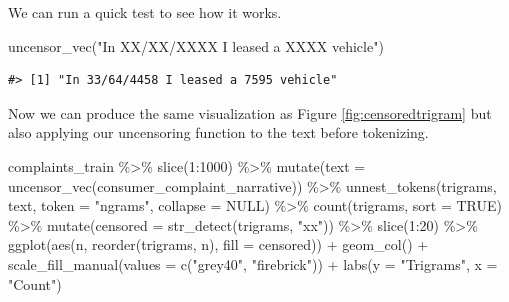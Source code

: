 \documentclass[
]{krantz}
\makeatletter
\newenvironment{Shaded}{\begin{snugshade}}{\end{snugshade}}
\newcommand{\AttributeTok}[1]{\textcolor[rgb]{0.77,0.63,0.00}{#1}}
\newcommand{\ConstantTok}[1]{\textcolor[rgb]{0.00,0.00,0.00}{#1}}
\newcommand{\DecValTok}[1]{\textcolor[rgb]{0.00,0.00,0.81}{#1}}
\newcommand{\FunctionTok}[1]{\textcolor[rgb]{0.00,0.00,0.00}{#1}}
\newcommand{\NormalTok}[1]{#1}
\newcommand{\SpecialCharTok}[1]{\textcolor[rgb]{0.00,0.00,0.00}{#1}}
\newcommand{\StringTok}[1]{\textcolor[rgb]{0.31,0.60,0.02}{#1}}
\newenvironment{kframe}{%
\medskip{}
\setlength{\fboxsep}{.8em}
 \def\at@end@of@kframe{}%
 \ifinner\ifhmode%
  \def\at@end@of@kframe{\end{minipage}}%
  \begin{minipage}{\columnwidth}%
 \fi\fi%
 \def\FrameCommand##1{\hskip\@totalleftmargin \hskip-\fboxsep
 \colorbox{shadecolor}{##1}\hskip-\fboxsep
     \hskip-\linewidth \hskip-\@totalleftmargin \hskip\columnwidth}%
 \MakeFramed {\advance\hsize-\width
   \@totalleftmargin\z@ \linewidth\hsize
   \@setminipage}}%
 {\par\unskip\endMakeFramed%
 \at@end@of@kframe}
\renewenvironment{Shaded}{\begin{kframe}}{\end{kframe}}
\makeatother
\begin{document}
We can run a quick test to see how it works.

\begin{Shaded}
\begin{Highlighting}[]
\FunctionTok{uncensor\_vec}\NormalTok{(}\StringTok{"In XX/XX/XXXX I leased a XXXX vehicle"}\NormalTok{)}
\end{Highlighting}
\end{Shaded}

\begin{verbatim}
#> [1] "In 33/64/4458 I leased a 7595 vehicle"
\end{verbatim}

Now we can produce the same visualization as Figure \ref{fig:censoredtrigram} but also applying our uncensoring function to the text before tokenizing.

\begin{Shaded}
\begin{Highlighting}[]
\NormalTok{complaints\_train }\SpecialCharTok{\%\textgreater{}\%}
  \FunctionTok{slice}\NormalTok{(}\DecValTok{1}\SpecialCharTok{:}\DecValTok{1000}\NormalTok{) }\SpecialCharTok{\%\textgreater{}\%}
  \FunctionTok{mutate}\NormalTok{(}\AttributeTok{text =} \FunctionTok{uncensor\_vec}\NormalTok{(consumer\_complaint\_narrative)) }\SpecialCharTok{\%\textgreater{}\%}
  \FunctionTok{unnest\_tokens}\NormalTok{(trigrams, text, }\AttributeTok{token =} \StringTok{"ngrams"}\NormalTok{,}
                \AttributeTok{collapse =} \ConstantTok{NULL}\NormalTok{) }\SpecialCharTok{\%\textgreater{}\%}
  \FunctionTok{count}\NormalTok{(trigrams, }\AttributeTok{sort =} \ConstantTok{TRUE}\NormalTok{) }\SpecialCharTok{\%\textgreater{}\%}
  \FunctionTok{mutate}\NormalTok{(}\AttributeTok{censored =} \FunctionTok{str\_detect}\NormalTok{(trigrams, }\StringTok{"xx"}\NormalTok{)) }\SpecialCharTok{\%\textgreater{}\%}
  \FunctionTok{slice}\NormalTok{(}\DecValTok{1}\SpecialCharTok{:}\DecValTok{20}\NormalTok{) }\SpecialCharTok{\%\textgreater{}\%}
  \FunctionTok{ggplot}\NormalTok{(}\FunctionTok{aes}\NormalTok{(n, }\FunctionTok{reorder}\NormalTok{(trigrams, n), }\AttributeTok{fill =}\NormalTok{ censored)) }\SpecialCharTok{+}
  \FunctionTok{geom\_col}\NormalTok{() }\SpecialCharTok{+}
  \FunctionTok{scale\_fill\_manual}\NormalTok{(}\AttributeTok{values =} \FunctionTok{c}\NormalTok{(}\StringTok{"grey40"}\NormalTok{, }\StringTok{"firebrick"}\NormalTok{)) }\SpecialCharTok{+}
  \FunctionTok{labs}\NormalTok{(}\AttributeTok{y =} \StringTok{"Trigrams"}\NormalTok{, }\AttributeTok{x =} \StringTok{"Count"}\NormalTok{)}
\end{Highlighting}
\end{Shaded}
\end{document}
